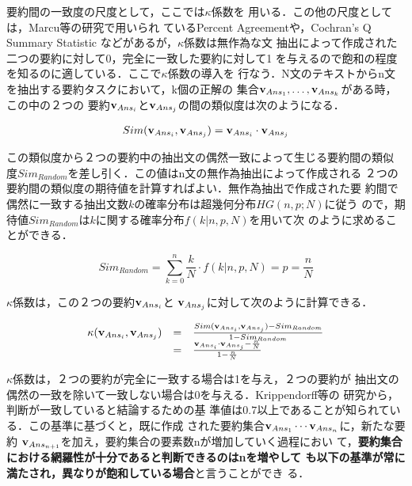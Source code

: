 要約間の一致度の尺度として，ここでは$\kappa$係数\cite{J.Carletta.96}を
用いる．この他の尺度としては，Marcu等の研究\cite{D.Marcu.97}で用いられ
ているPercent Agreement\cite{W.Gale.92}や，Cochran's Q Summary
Statistic \cite{W.G.Cochran.50}などがあるが，$\kappa$係数は無作為な文
抽出によって作成された二つの要約に対して0，完全に一致した要約に対して1
を与えるので飽和の程度を知るのに適している．ここで$\kappa$係数の導入を
行なう．N文のテキストからn文を抽出する要約タスクにおいて，k個の正解の
集合${\bf v}_{Ans_1}, \ldots, {\bf v}_{Ans_k}$がある時，この中の２つの
要約${\bf v}_{Ans_i}$と${\bf v}_{Ans_j}$の間の類似度は次のようになる．

\begin{eqnarray}
Sim({\bf v}_{Ans_i}, {\bf v}_{Ans_j}) = {\bf v}_{Ans_i} \cdot {\bf v}_{Ans_j}
\end{eqnarray}

この類似度から２つの要約中の抽出文の偶然一致によって生じる要約間の類似
度$Sim_{Random}$を差し引く．この値はn文の無作為抽出によって作成される
２つの要約間の類似度の期待値を計算すればよい．無作為抽出で作成された要
約間で偶然に一致する抽出文数$k$の確率分布は超幾何分布$HG(n,p;N)$に従う
ので，期待値$Sim_{Random}$は$k$に関する確率分布$f(k|n,p,N)$を用いて次
のように求めることができる．

\begin{equation}
Sim_{Random} = \sum_{k=0}^{n} \frac{k}{N} \cdot f(k|n,p,N) = p = \frac{n}{N}
\end{equation} 

$\kappa$係数\cite{J.Carletta.96}は，この２つの要約${\bf v}_{Ans_i}$と
${\bf v}_{Ans_j}$に対して次のように計算できる．

\begin{equation} 
\begin{array}{lcl}
\kappa({\bf v}_{Ans_i}, {\bf v}_{Ans_j})& = &\frac{Sim({\bf v}_{Ans_i}, {\bf v}_{Ans_j}) - Sim_{Random}}{1 - Sim_{Random}} \\
& = & \frac{{\bf v}_{Ans_i} \cdot {\bf v}_{Ans_j} - \frac{n}{N}}{1 - \frac{n}{N}}
\end{array}
\label{kappa-def}
\end{equation}

$\kappa$係数は，２つの要約が完全に一致する場合は1を与え，２つの要約が
抽出文の偶然の一致を除いて一致しない場合は0を与える．Krippendorff等の
研究\cite{K.Krippendorff.80}から，判断が一致していると結論するための基
準値は$0.7$以上であることが知られている．この基準に基づくと，既に作成
された要約集合${\bf v}_{Ans_1} \cdots {\bf v}_{Ans_n}$に，新たな要約
${\bf v}_{Ans_{n+1}}$を加え，要約集合の要素数nが増加していく過程におい
て，{\bf 要約集合における網羅性が十分であると判断できるのはnを増やして
も以下の基準が常に満たされ，異なりが飽和している場合}と言うことができ
る．

